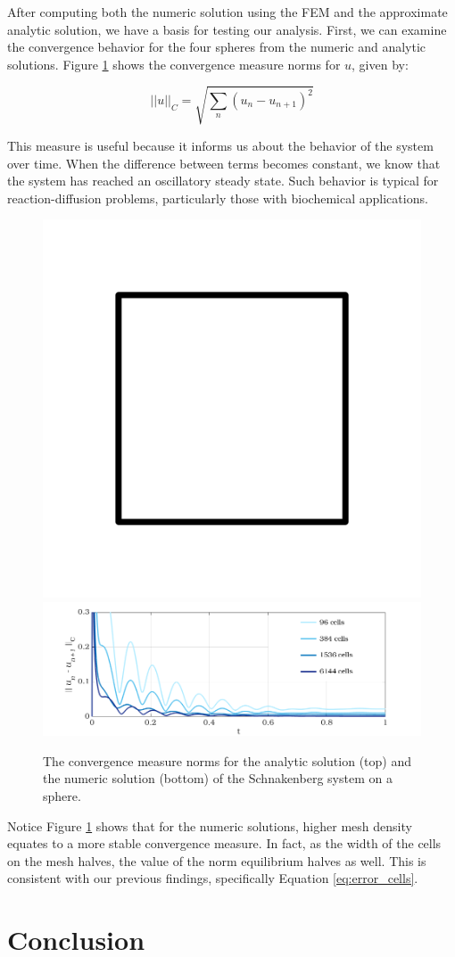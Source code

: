 \documentclass[12pt]{article}
\begin{document}
After computing both the numeric solution using the FEM and the approximate analytic solution, we have a basis for testing our analysis. First, we can examine the convergence behavior for the four spheres from the numeric and analytic solutions. Figure \ref{fig:inner_norms} shows the convergence measure norms for $u$, given by:

$$ ||u||_C = \sqrt{\sum_n (u_{n} - u_{n+1})^2} $$

This measure is useful because it informs us about the behavior of the system over time. When the difference between terms becomes constant, we know that the system has reached an oscillatory steady state. Such behavior is typical for reaction-diffusion problems, particularly those with biochemical applications. 

\begin{figure}[H]
	\includegraphics[width=.5\linewidth]{xxx.png}\\
	\includegraphics[width=\linewidth, trim= 1.4cm 0 2cm 0, clip]{norm_numeric.png}
	\caption{The convergence measure norms for the analytic solution (top) and the numeric solution (bottom) of the Schnakenberg system on a sphere.}
	\label{fig:inner_norms}
\end{figure}

Notice Figure \ref{fig:inner_norms} shows that for the numeric solutions, higher mesh density equates to a more stable convergence measure. In fact, as the width of the cells on the mesh halves, the value of the norm equilibrium halves as well. This is consistent with our previous findings, specifically Equation \ref{eq:error_cells}.

\section{Conclusion}
\end{document}
